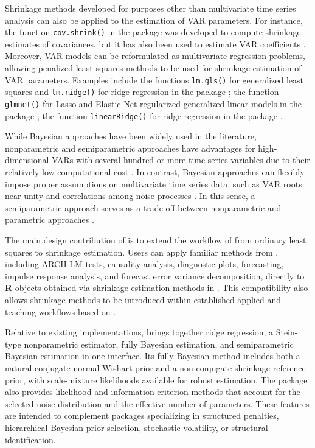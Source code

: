 Shrinkage methods developed for purposes other than
multivariate time series analysis can also be applied to the estimation of
VAR parameters. For instance, the function \texttt{cov.shrink()} in the package  was developed
to compute shrinkage estimates of covariances, but
it has also been used to estimate VAR coefficients
\citep{Rhein07c, Schafer17}. Moreover, VAR models can be reformulated as multivariate regression problems, allowing penalized least squares methods to be used for
shrinkage estimation of VAR parameters. Examples include the functions
\texttt{lm.gls()} for generalized least squares and \texttt{lm.ridge()} for
ridge regression in the package  \citep{Ripley18}; the
function \texttt{glmnet()} for Lasso and Elastic-Net regularized
generalized linear models in the package 
\citep{Frideman18}; the function \texttt{linearRidge()} for ridge
regression in the package  \citep{Moritz18}.

While Bayesian approaches have been widely used in the literature,
nonparametric and semiparametric approaches have advantages
for high-dimensional VARs with several hundred or more
time series variables due to their relatively low computational cost
\citep{Rhein07c}. In contrast,
Bayesian approaches can flexibly impose proper assumptions on multivariate
time series data, such as VAR roots near unity and correlations
among noise processes \citep{LeeChoiKim2016}. In this sense, a
semiparametric approach serves as a trade-off between nonparametric and
parametric approaches \citep{LeeChoiKim2016}.

The main design contribution of  is to extend the
workflow of  from ordinary least squares to shrinkage
estimation. Users can apply familiar methods from ,
including ARCH-LM tests, causality analysis, diagnostic plots,
forecasting, impulse response analysis, and
forecast error variance decomposition, directly to
\textbf{R} objects obtained via shrinkage estimation methods in
. This compatibility also allows shrinkage
methods to be introduced within established applied and teaching
workflows based on .

Relative to existing implementations,  brings
together ridge regression, a Stein-type nonparametric estimator, fully
Bayesian estimation, and semiparametric Bayesian estimation in one
interface. Its fully Bayesian method includes both a natural conjugate
normal-Wishart prior and a non-conjugate
shrinkage-reference prior, with scale-mixture likelihoods available for
robust estimation. The package also provides likelihood and information
criterion methods that account for the selected noise distribution and
the effective number of parameters. These features are intended to
complement packages specializing in structured
penalties, hierarchical Bayesian prior selection, stochastic
volatility, or structural identification.

